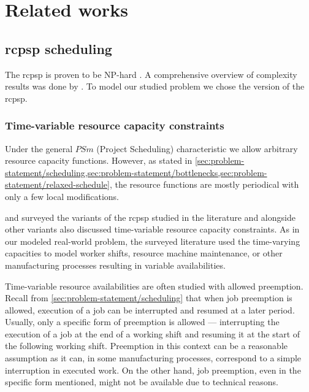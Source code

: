 \chapter{Related works} \label{chap:related-works}

\section{\acs{rcpsp} scheduling} \label{sec:related-works/scheduling-the-rcpsp}

The \ac{rcpsp} is proven to be NP-hard \citep{Blazewicz1983}.
A comprehensive overview of complexity results was done by \citet{Ganian2021}.
To model our studied problem we chose the \Problem{} version of the \ac{rcpsp}.
\subsection{Time-variable resource capacity constraints} \label{subsec:related-works/scheduling-the-rcpsp/time-variable-resource-capacity-constraints}

Under the general $PSm$ (Project Scheduling) characteristic we allow arbitrary resource capacity functions.
However, as stated in \cref{sec:problem-statement/scheduling,sec:problem-statement/bottlenecks,sec:problem-statement/relaxed-schedule},
the resource functions are mostly periodical with only a few local modifications.

\citet{Hartmann2010} and \citet{Hartmann2022} surveyed the variants of the \ac{rcpsp} studied in the literature
and alongside other variants also discussed time-variable resource capacity constraints.
As in our modeled real-world problem,
the surveyed literature used the time-varying capacities to model worker shifts,
resource machine maintenance, or other manufacturing processes resulting in variable availabilities.

Time-variable resource availabilities are often studied with allowed preemption.
Recall from \cref{sec:problem-statement/scheduling} that when job preemption is allowed,
execution of a job can be interrupted and resumed at a later period.
Usually, only a specific form of preemption is allowed ---
interrupting the execution of a job at the end of a working shift
and resuming it at the start of the following working shift.
Preemption in this context can be a reasonable assumption as it can,
in some manufacturing processes, correspond to a simple interruption in executed work.
On the other hand, job preemption, even in the specific form mentioned,
might not be available due to technical reasons.

